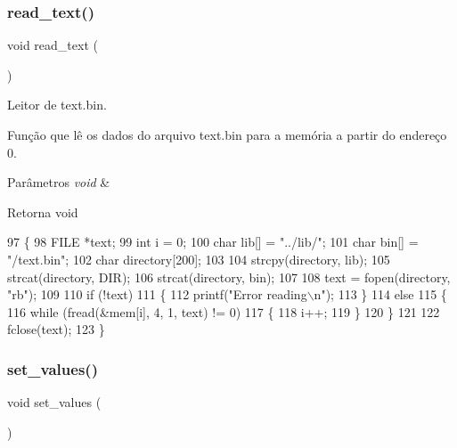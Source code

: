\subsubsection{read\+\_\+text()}
{\footnotesize\ttfamily void read\+\_\+text (\begin{DoxyParamCaption}\item[{void}]{ }\end{DoxyParamCaption})}



Leitor de text.\+bin. 

Função que lê os dados do arquivo text.\+bin para a memória a partir do endereço 0. 
\begin{DoxyParams}{Parâmetros}
{\em void} & \\
\hline
\end{DoxyParams}
\begin{DoxyReturn}{Retorna}
void 
\end{DoxyReturn}

\begin{DoxyCode}
97 \{
98     FILE *text;
99     \textcolor{keywordtype}{int} i = 0;
100     \textcolor{keywordtype}{char} lib[] = \textcolor{stringliteral}{"../lib/"};
101     \textcolor{keywordtype}{char} bin[] = \textcolor{stringliteral}{"/text.bin"};
102     \textcolor{keywordtype}{char} directory[200];
103 
104     strcpy(directory, lib);
105     strcat(directory, DIR);
106     strcat(directory, bin);
107 
108     text = fopen(directory, \textcolor{stringliteral}{"rb"});
109 
110     \textcolor{keywordflow}{if} (!text)
111     \{
112         printf(\textcolor{stringliteral}{"Error reading\(\backslash\)n"});
113     \}
114     \textcolor{keywordflow}{else}
115     \{
116         \textcolor{keywordflow}{while} (fread(&mem[i], 4, 1, text) != 0)
117         \{
118             i++;
119         \}
120     \}
121 
122     fclose(text);
123 \}
\end{DoxyCode}
\mbox{\label{init_8h_a1ac07c339a3dae69dbacd87fcf0d2447}} 
\subsubsection{set\+\_\+values()}
{\footnotesize\ttfamily void set\+\_\+values (\begin{DoxyParamCaption}\item[{void}]{ }\end{DoxyParamCaption})}

